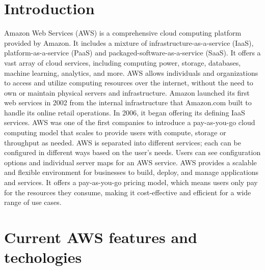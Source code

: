 \documentclass[11pt,a4paper,oneside]{report}
\begin{document}


\newpage
\tableofcontents
\pagebreak

\chapter{Introduction}

Amazon Web Services (AWS) is a comprehensive cloud computing platform provided by Amazon. It includes a mixture of infrastructure-as-a-service (IaaS), platform-as-a-service (PaaS) and packaged-software-as-a-service (SaaS). It offers a vast array of cloud services, including computing power, storage, databases, machine learning, analytics, and more. AWS allows individuals and organizations to access and utilize computing resources over the internet, without the need to own or maintain physical servers and infrastructure.
Amazon launched its first web services in 2002 from the internal infrastructure that Amazon.com built to handle its online retail operations. In 2006, it began offering its defining IaaS services. AWS was one of the first companies to introduce a pay-as-you-go cloud computing model that scales to provide users with compute, storage or throughput as needed.
AWS is separated into different services; each can be configured in different ways based on the user's needs. Users can see configuration options and individual server maps for an AWS service. AWS provides a scalable and flexible environment for businesses to build, deploy, and manage applications and services. It offers a pay-as-you-go pricing model, which means users only pay for the resources they consume, making it cost-effective and efficient for a wide range of use cases. \cite{techtagaws}

\chapter{Current AWS features and techologies}
\end{document}
